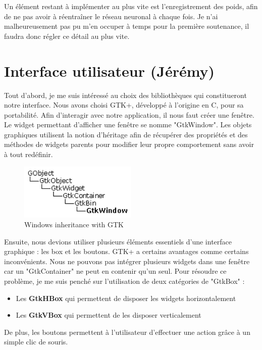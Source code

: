 \documentclass[12pt]{report}
\begin{document}
\newpage
Un élément restant à implémenter au plus vite est l'enregistrement des poids, afin de ne pas avoir à réentraîner le réseau neuronal à chaque fois. Je n'ai malheureusement pas pu m'en occuper à temps pour la première soutenance, il faudra donc régler ce détail au plus vite.

\section{Interface utilisateur (Jérémy)}

Tout d’abord, je me suis intéressé au choix des bibliothèques qui constitueront notre interface. Nous avons choisi GTK+, développé à l’origine en C, pour sa portabilité.
Afin d’interagir avec notre application, il nous faut créer une fenêtre. Le widget permettant d’afficher une fenêtre se nomme "GtkWindow". Les objets graphiques utilisent la notion d’héritage afin de récupérer des propriétés et des méthodes de widgets parents pour modifier leur propre comportement sans avoir à tout redéfinir. 

\begin{figure}[H]
    \centering
    \includegraphics[width=0.5\textwidth]{GTK1}
    \caption{Windows inheritance with GTK}
\end{figure}

Ensuite, nous devions utiliser plusieurs éléments essentiels d’une interface graphique : les box et les boutons. GTK+ a certains avantages comme certains inconvénients. Nous ne pouvons pas intégrer plusieurs widgets dans une fenêtre car un "GtkContainer" ne peut en contenir qu’un seul. Pour résoudre ce problème, je me suis penché sur l’utilisation de deux catégories de "GtkBox" :

\begin{itemize}[label=\textbullet]
	\item Les \textbf{GtkHBox} qui permettent de disposer les widgets horizontalement
	\item Les \textbf{GtkVBox} qui permettent de les disposer verticalement
\end{itemize}

\newpage
De plus, les boutons permettent à l’utilisateur d’effectuer une action grâce à un simple clic de souris. 
\end{document}
